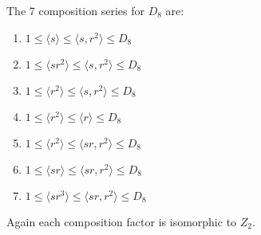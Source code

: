 \documentclass{article}
\begin{document}
The 7 composition series for $D_8$ are:
\begin{enumerate}[itemsep=0em]
    \item $1 \leq \langle s \rangle \leq \langle s, r^2 \rangle \leq D_8$
    \item $1 \leq \langle sr^2 \rangle \leq \langle s, r^2 \rangle \leq D_8$
    \item $1 \leq \langle r^2 \rangle \leq \langle s, r^2 \rangle \leq D_8$
    \item $1 \leq \langle r^2 \rangle \leq \langle r \rangle \leq D_8$
    \item $1 \leq \langle r^2 \rangle \leq \langle sr, r^2 \rangle \leq D_8$
    \item $1 \leq \langle sr \rangle \leq \langle sr, r^2 \rangle \leq D_8$
    \item $1 \leq \langle sr^3 \rangle \leq \langle sr, r^2 \rangle \leq D_8$
\end{enumerate}
Again each composition factor is isomorphic to $Z_2$.
\end{document}
